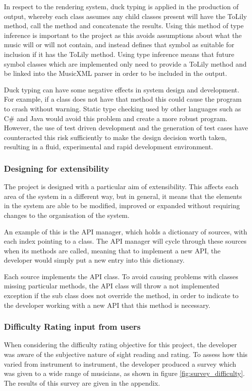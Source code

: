 In respect to the rendering system, duck typing is applied in the production of output, whereby each class assumes any child classes present will have the ToLily method, call the method and concatenate the results. Using this method of type inference is important to the project as this avoids assumptions about what the music will or will not contain, and instead defines that symbol as suitable for inclusion if it has the ToLily method. Using type inference means that future symbol classes which are implemented only need to provide a ToLily method and be linked into the MusicXML parser in order to be included in the output.

Duck typing can have some negative effects in system design and development. For example, if a class does not have that method this could cause the program to crash without warning. Static type checking used by other languages such as C\# and Java would avoid this problem and create a more robust program. However, the use of test driven development and the generation of test cases have counteracted this risk sufficiently to make the design decision worth taken, resulting in a fluid, experimental and rapid development environment.

\subsubsection{Designing for extensibility}
The project is designed with a particular aim of extensibility. This affects each area of the system in a different way, but in general, it means that the elements in the system are able to be modified, improved or expanded without requiring changes to the organisation of the system. 

An example of this is the API manager, which holds a dictionary of sources, with each index pointing to a class. The API manager will cycle through these sources when its methods are called, meaning that to implement a new API, the developer would simply put a new entry into this dictionary.

Each source implements the API class. To avoid causing problems with classes missing particular methods, the API class will throw a not implemented exception if the sub class does not override the method, in order to indicate to the developer working with a new API that this method is necessary.

\subsubsection{Difficulty Rating input from users}
When considering the difficulty rating objective for this project, the developer was aware of the subjective nature of sight reading and rating. To assess how this varied from instrument to instrument, the developer produced a survey which was given to a wide range of musicians, as shown in figure \ref{fig:survey_difficulty}. The results of this survey are given in the appendix.

